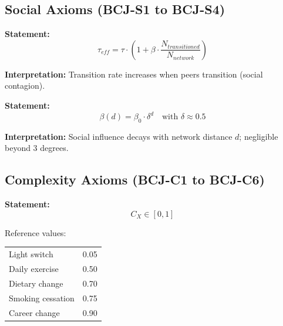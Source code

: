 \subsection{Social Axioms (BCJ-S1 to BCJ-S4)}

\begin{tcolorbox}[colback=gray!5!white, colframe=gray!75!black,
    title=Axiom BCJ-S1: Social Contagion]
\textbf{Statement:}
\begin{equation}
\tau_{eff} = \tau \cdot \left(1 + \beta \cdot \frac{N_{transitioned}}{N_{network}}\right)
\end{equation}

\textbf{Interpretation:} Transition rate increases when peers transition (social contagion).
\end{tcolorbox}

\begin{tcolorbox}[colback=gray!5!white, colframe=gray!75!black,
    title=Axiom BCJ-S2: Three Degrees of Influence]
\textbf{Statement:}
\begin{equation}
\beta(d) = \beta_0 \cdot \delta^d \quad \text{with } \delta \approx 0.5
\end{equation}

\textbf{Interpretation:} Social influence decays with network distance $d$; negligible beyond 3 degrees.
\end{tcolorbox}

\subsection{Complexity Axioms (BCJ-C1 to BCJ-C6)}

\begin{tcolorbox}[colback=gray!5!white, colframe=gray!75!black,
    title=Axiom BCJ-C1: Complexity Definition]
\textbf{Statement:}
\begin{equation}
C_X \in [0, 1]
\end{equation}

Reference values:
\begin{center}
\begin{tabular}{lc}
Light switch & 0.05 \\
Daily exercise & 0.50 \\
Dietary change & 0.70 \\
Smoking cessation & 0.75 \\
Career change & 0.90 \\
\end{tabular}
\end{center}
\end{tcolorbox}

